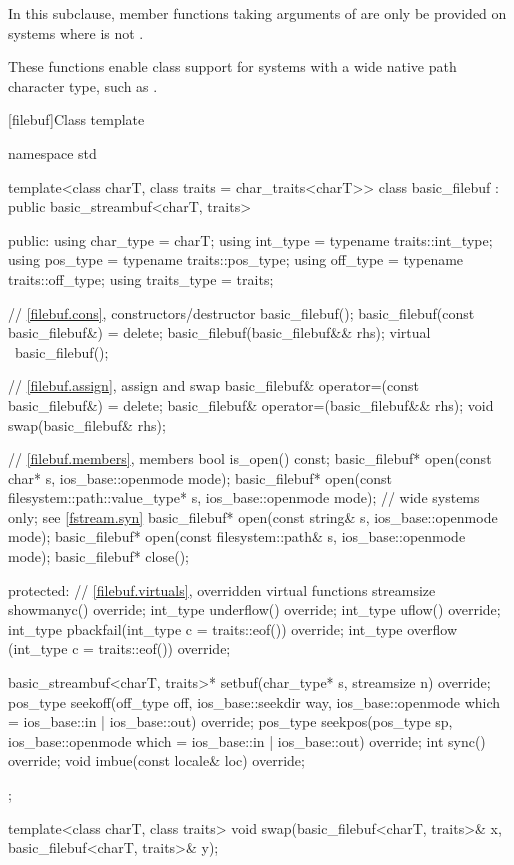 \pnum
In this subclause, member functions taking arguments of 
are only be provided on systems where  is not .
\begin{note}
These functions enable class  support for systems with a wide native path character type, such as .
\end{note}

[filebuf]{Class template }

%
\begin{codeblock}
namespace std {
  template<class charT, class traits = char_traits<charT>>
  class basic_filebuf : public basic_streambuf<charT, traits> {
  public:
    using char_type   = charT;
    using int_type    = typename traits::int_type;
    using pos_type    = typename traits::pos_type;
    using off_type    = typename traits::off_type;
    using traits_type = traits;

    // \ref{filebuf.cons}, constructors/destructor
    basic_filebuf();
    basic_filebuf(const basic_filebuf&) = delete;
    basic_filebuf(basic_filebuf&& rhs);
    virtual ~basic_filebuf();

    // \ref{filebuf.assign}, assign and swap
    basic_filebuf& operator=(const basic_filebuf&) = delete;
    basic_filebuf& operator=(basic_filebuf&& rhs);
    void swap(basic_filebuf& rhs);

    // \ref{filebuf.members}, members
    bool is_open() const;
    basic_filebuf* open(const char* s, ios_base::openmode mode);
    basic_filebuf* open(const filesystem::path::value_type* s,
                        ios_base::openmode mode);   // wide systems only; see \ref{fstream.syn}
    basic_filebuf* open(const string& s,
                        ios_base::openmode mode);
    basic_filebuf* open(const filesystem::path& s,
                        ios_base::openmode mode);
    basic_filebuf* close();

  protected:
    // \ref{filebuf.virtuals}, overridden virtual functions
    streamsize showmanyc() override;
    int_type underflow() override;
    int_type uflow() override;
    int_type pbackfail(int_type c = traits::eof()) override;
    int_type overflow (int_type c = traits::eof()) override;

    basic_streambuf<charT, traits>* setbuf(char_type* s,
                                           streamsize n) override;
    pos_type seekoff(off_type off, ios_base::seekdir way,
                     ios_base::openmode which
                      = ios_base::in | ios_base::out) override;
    pos_type seekpos(pos_type sp,
                     ios_base::openmode which
                      = ios_base::in | ios_base::out) override;
    int      sync() override;
    void     imbue(const locale& loc) override;
  };

  template<class charT, class traits>
    void swap(basic_filebuf<charT, traits>& x,
              basic_filebuf<charT, traits>& y);
}
\end{codeblock}

